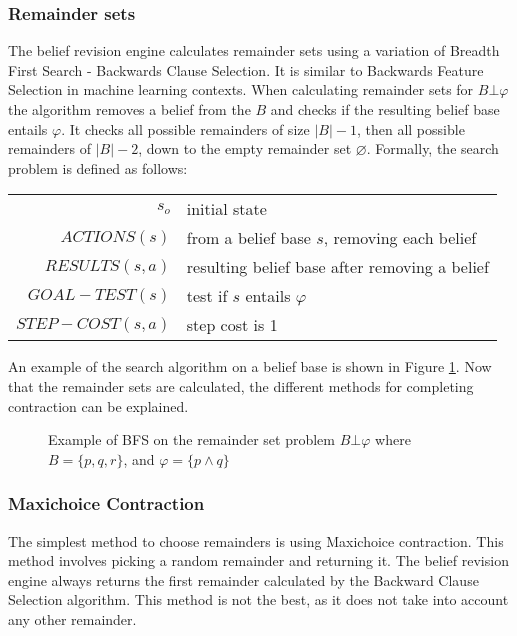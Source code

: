 \documentclass[a4paper,10pt]{article}
\newcommand{\norm}[1]{\lvert #1 \rvert}
\begin{document}
\subsubsection{Remainder sets}
\label{subsubsec:remainders}
The belief revision engine calculates remainder sets using a variation of Breadth First Search - Backwards Clause Selection. It is similar to Backwards Feature Selection in machine learning contexts. When calculating remainder sets for $B \bot\varphi$ the algorithm removes a belief from the $B$ and checks if the resulting belief base entails $\varphi$. It checks all possible remainders of size $\norm{B}-1$, then all possible remainders of $\norm{B}-2$, down to the empty remainder set $\varnothing$. Formally, the search problem is defined as follows:
\begin{table}[!htb]
\centering
\begin{tabular}{rl}
$s_o$ & initial state \\
$ACTIONS(s)$ & from a belief base $s$, removing each belief \\
$RESULTS(s, a)$ & resulting belief base after removing a belief \\
$GOAL-TEST(s)$ & test if $s$ entails $\varphi$ \\
$STEP-COST(s,a)$ & step cost is 1 \\
\end{tabular}
\end{table}

An example of the search algorithm on a belief base is shown in Figure \ref{fig:BFS}. Now that the remainder sets are calculated, the different methods for completing contraction can be explained.
\begin{figure}[!htb]
\centering
\caption{Example of BFS on the remainder set problem $B \bot\varphi$ where $B = \{p,q,r\}$, and $\varphi = \{p \wedge q\}$}
\label{fig:BFS}
\end{figure}

\subsubsection{Maxichoice Contraction}
\label{sec:maxichoice}
The simplest method to choose remainders is using Maxichoice contraction. This method involves picking a random remainder and returning it. The belief revision engine always returns the first remainder calculated by the Backward Clause Selection algorithm. This method is not the best, as it does not take into account any other remainder.
\end{document}
